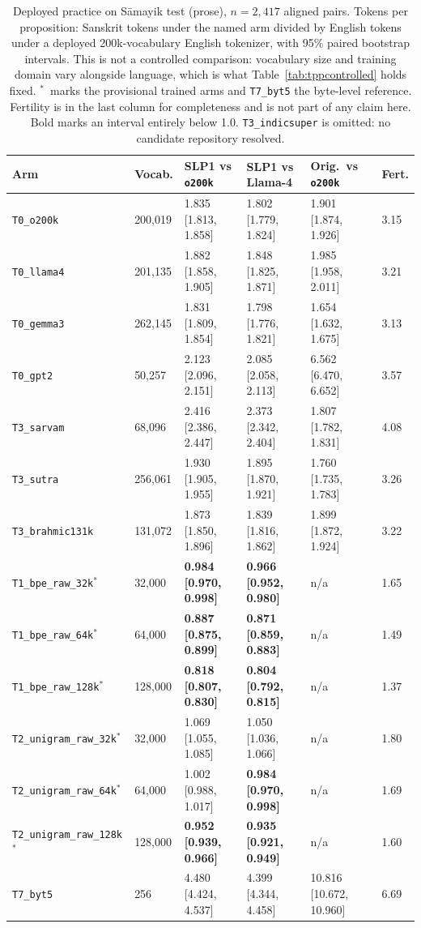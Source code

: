 \begin{table}[t]
\centering
\scriptsize
\begin{tabular}{llllll}
\toprule
Arm & Vocab. & SLP1 vs \texttt{o200k} & SLP1 vs Llama-4 & Orig.\ vs \texttt{o200k} & Fert. \\
\midrule
\texttt{T0\_o200k} & 200,019 & 1.835 [1.813, 1.858] & 1.802 [1.779, 1.824] & 1.901 [1.874, 1.926] & 3.15 \\
\texttt{T0\_llama4} & 201,135 & 1.882 [1.858, 1.905] & 1.848 [1.825, 1.871] & 1.985 [1.958, 2.011] & 3.21 \\
\texttt{T0\_gemma3} & 262,145 & 1.831 [1.809, 1.854] & 1.798 [1.776, 1.821] & 1.654 [1.632, 1.675] & 3.13 \\
\texttt{T0\_gpt2} & 50,257 & 2.123 [2.096, 2.151] & 2.085 [2.058, 2.113] & 6.562 [6.470, 6.652] & 3.57 \\
\texttt{T3\_sarvam} & 68,096 & 2.416 [2.386, 2.447] & 2.373 [2.342, 2.404] & 1.807 [1.782, 1.831] & 4.08 \\
\texttt{T3\_sutra} & 256,061 & 1.930 [1.905, 1.955] & 1.895 [1.870, 1.921] & 1.760 [1.735, 1.783] & 3.26 \\
\texttt{T3\_brahmic131k} & 131,072 & 1.873 [1.850, 1.896] & 1.839 [1.816, 1.862] & 1.899 [1.872, 1.924] & 3.22 \\
\texttt{T1\_bpe\_raw\_32k}$^{*}$ & 32,000 & \textbf{0.984 [0.970, 0.998]} & \textbf{0.966 [0.952, 0.980]} & n/a & 1.65 \\
\texttt{T1\_bpe\_raw\_64k}$^{*}$ & 64,000 & \textbf{0.887 [0.875, 0.899]} & \textbf{0.871 [0.859, 0.883]} & n/a & 1.49 \\
\texttt{T1\_bpe\_raw\_128k}$^{*}$ & 128,000 & \textbf{0.818 [0.807, 0.830]} & \textbf{0.804 [0.792, 0.815]} & n/a & 1.37 \\
\texttt{T2\_unigram\_raw\_32k}$^{*}$ & 32,000 & 1.069 [1.055, 1.085] & 1.050 [1.036, 1.066] & n/a & 1.80 \\
\texttt{T2\_unigram\_raw\_64k}$^{*}$ & 64,000 & 1.002 [0.988, 1.017] & \textbf{0.984 [0.970, 0.998]} & n/a & 1.69 \\
\texttt{T2\_unigram\_raw\_128k}$^{*}$ & 128,000 & \textbf{0.952 [0.939, 0.966]} & \textbf{0.935 [0.921, 0.949]} & n/a & 1.60 \\
\texttt{T7\_byt5} & 256 & 4.480 [4.424, 4.537] & 4.399 [4.344, 4.458] & 10.816 [10.672, 10.960] & 6.69 \\
\bottomrule
\end{tabular}
\caption{Deployed practice on S\=amayik test (prose), $n=2{,}417$ aligned pairs. Tokens per proposition: Sanskrit tokens under the named arm divided by English tokens under a deployed 200k-vocabulary English tokenizer, with 95\% paired bootstrap intervals. This is not a controlled comparison: vocabulary size and training domain vary alongside language, which is what Table~\ref{tab:tppcontrolled} holds fixed. $^{*}$~marks the provisional trained arms and \texttt{T7\_byt5} the byte-level reference. Fertility is in the last column for completeness and is not part of any claim here. Bold marks an interval entirely below 1.0. \texttt{T3\_indicsuper} is omitted: no candidate repository resolved.}
\label{tab:tppdeployed-samayik-test}
\end{table}

